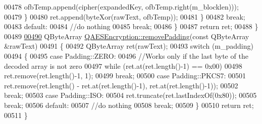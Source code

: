 \begin{DoxyCode}
00478             ofbTemp.append(cipher(expandedKey, ofbTemp.right(m\_blocklen)));
00479         \}
00480         ret.append(byteXor(rawText, ofbTemp));
00481     \}
00482         \textcolor{keywordflow}{break};
00483     \textcolor{keywordflow}{default}:
00484         \textcolor{comment}{//do nothing}
00485         \textcolor{keywordflow}{break};
00486     \}
00487     \textcolor{keywordflow}{return} ret;
00488 \}
00489 
\hypertarget{qaesencryption_8cpp_source.tex_l00490}{}\hyperlink{class_q_a_e_s_encryption_a4dc7e77485e5a3e63eebc99b9386c17b}{00490} QByteArray \hyperlink{class_q_a_e_s_encryption_a4dc7e77485e5a3e63eebc99b9386c17b}{QAESEncryption::removePadding}(\textcolor{keyword}{const} QByteArray &rawText)
00491 \{
00492     QByteArray ret(rawText);
00493     \textcolor{keywordflow}{switch} (m\_padding)
00494     \{
00495     \textcolor{keywordflow}{case} Padding::ZERO:
00496         \textcolor{comment}{//Works only if the last byte of the decoded array is not zero}
00497         \textcolor{keywordflow}{while} (ret.at(ret.length()-1) == 0x00)
00498             ret.remove(ret.length()-1, 1);
00499         \textcolor{keywordflow}{break};
00500     \textcolor{keywordflow}{case} Padding::PKCS7:
00501         ret.remove(ret.length() - ret.at(ret.length()-1), ret.at(ret.length()-1));
00502         \textcolor{keywordflow}{break};
00503     \textcolor{keywordflow}{case} Padding::ISO:
00504         ret.truncate(ret.lastIndexOf(0x80));
00505         \textcolor{keywordflow}{break};
00506     \textcolor{keywordflow}{default}:
00507         \textcolor{comment}{//do nothing}
00508         \textcolor{keywordflow}{break};
00509     \}
00510     \textcolor{keywordflow}{return} ret;
00511 \}
\end{DoxyCode}
